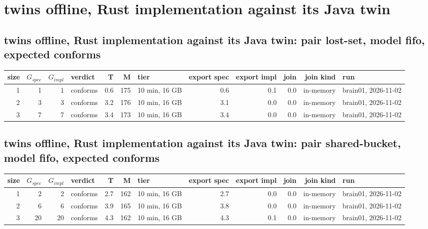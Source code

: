 \documentclass[10pt]{article}
\begin{document}
\section*{twins offline, Rust implementation against its Java twin}
\subsection*{twins offline, Rust implementation against its Java twin: pair \textsf{lost-set}, model fifo, expected conforms}
\begin{longtable}{@{}rrrlrrlrrrrl@{}}
\toprule
size & $G_{\mathit{spec}}$ & $G_{\mathit{impl}}$ & verdict & T & M & tier & export spec & export impl & join & join kind & run \\
\midrule
\endhead
\color{red} 1 & 1 & 1 & conforms & 0.6 & 175 & 10 min, 16 GB & 0.6 & 0.1 & 0.0 & in-memory & brain01, 2026-11-02 \\
\color{red} 2 & 3 & 3 & conforms & 3.2 & 176 & 10 min, 16 GB & 3.1 & 0.0 & 0.0 & in-memory & brain01, 2026-11-02 \\
\color{red} 3 & 7 & 7 & conforms & 3.4 & 173 & 10 min, 16 GB & 3.4 & 0.0 & 0.0 & in-memory & brain01, 2026-11-02 \\
\bottomrule
\end{longtable}
\subsection*{twins offline, Rust implementation against its Java twin: pair \textsf{shared-bucket}, model fifo, expected conforms}
\begin{longtable}{@{}rrrlrrlrrrrl@{}}
\toprule
size & $G_{\mathit{spec}}$ & $G_{\mathit{impl}}$ & verdict & T & M & tier & export spec & export impl & join & join kind & run \\
\midrule
\endhead
\color{red} 1 & 2 & 2 & conforms & 2.7 & 162 & 10 min, 16 GB & 2.7 & 0.0 & 0.0 & in-memory & brain01, 2026-11-02 \\
\color{red} 2 & 6 & 6 & conforms & 3.9 & 165 & 10 min, 16 GB & 3.8 & 0.0 & 0.0 & in-memory & brain01, 2026-11-02 \\
\color{red} 3 & 20 & 20 & conforms & 4.3 & 162 & 10 min, 16 GB & 4.3 & 0.1 & 0.0 & in-memory & brain01, 2026-11-02 \\
\bottomrule
\end{longtable}
\end{document}

